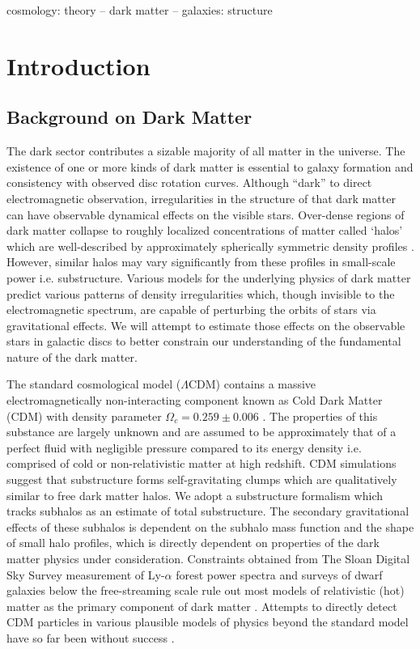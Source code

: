 \documentclass[usenatbib]{mnras}
\newcommand{\lcdm}{$\Lambda$CDM}
\begin{document}
\begin{keywords}
cosmology: theory -- dark matter -- galaxies: structure
\end{keywords}

\section{Introduction}

\subsection{Background on Dark Matter}

The dark sector contributes a sizable majority of all matter in the universe. The existence of one or more kinds of dark matter is essential to galaxy formation and consistency with observed disc rotation curves. {\color{magenta} Although ``dark'' to direct electromagnetic observation, irregularities in the structure of that dark matter can have observable dynamical effects on the visible stars.} Over-dense regions of dark matter collapse to roughly localized concentrations of matter called ‘halos’ which are well-described by approximately spherically symmetric density profiles \citep{structure}. However, similar halos may vary significantly from these profiles in small-scale power i.e. substructure. Various models for the underlying physics of dark matter predict various patterns of density irregularities which, though invisible to the electromagnetic spectrum, are capable of perturbing the orbits of stars via gravitational effects. We will attempt to estimate those effects on the observable stars in galactic discs to better constrain our understanding of the fundamental nature of the dark matter.
             
\par

The standard cosmological model (\lcdm) contains a massive electromagnetically non-interacting component known as Cold Dark Matter (CDM) with density parameter $\Omega_c = 0.259 \pm 0.006$ \citep{planck}. The properties of this substance are largely unknown and are assumed to be approximately that of a perfect fluid with negligible pressure compared to its energy density i.e. comprised of cold or non-relativistic matter at high redshift. CDM simulations suggest that substructure forms self-gravitating clumps which are qualitatively similar to free dark matter halos. We adopt a substructure formalism which tracks subhalos as an estimate of total substructure. The secondary gravitational effects of these subhalos is dependent on the subhalo mass function and the shape of small halo profiles, which is directly dependent on properties of the dark matter physics under consideration. Constraints obtained from The Sloan Digital Sky Survey measurement of Ly-$\alpha$ forest power spectra and surveys of dwarf galaxies below the free-streaming scale rule out most models of relativistic (hot) matter as the primary component of dark matter \citep{can_neutrinos}. Attempts to directly detect CDM particles in various plausible models of physics beyond the standard model have so far been without success \citep{direct_detection}.
\end{document}
